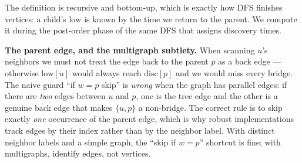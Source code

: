 The definition is recursive and bottom-up, which is exactly how DFS finishes vertices:
a child's $\mathrm{low}$ is known by the time we return to the parent. We compute it
during the post-order phase of the same DFS that assigns discovery times.

\begin{algorithm}[H]
\caption{\textsc{DFS-LowLink}: discovery times and low-link in one pass}
\label{ch10:alg-lowlink}
\end{algorithm}

\begin{trapbox}
\textbf{The parent edge, and the multigraph subtlety.} When scanning $u$'s neighbors
we must not treat the edge back to the parent $p$ as a back edge --- otherwise
$\mathrm{low}[u]$ would always reach $\mathrm{disc}[p]$ and we would miss every bridge.
The naive guard ``if $w=p$ skip'' is \emph{wrong} when the graph has parallel edges: if
there are \emph{two} edges between $u$ and $p$, one is the tree edge and the other is a
genuine back edge that makes $\{u,p\}$ a non-bridge. The correct rule is to skip
exactly \emph{one} occurrence of the parent edge, which is why robust implementations
track edges by their index rather than by the neighbor label. With distinct neighbor
labels and a simple graph, the ``skip if $w=p$'' shortcut is fine; with multigraphs,
identify edges, not vertices.
\end{trapbox}

